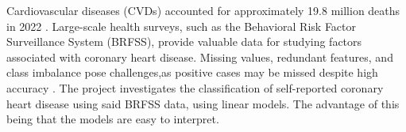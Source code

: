 Cardiovascular diseases (CVDs) accounted for approximately 19.8 million deaths in 2022 \cite{who2025}. Large-scale health surveys, such as the Behavioral Risk Factor Surveillance System (BRFSS), provide valuable data for studying factors associated with coronary heart disease. Missing values, redundant features, and class imbalance pose challenges,as positive cases may be missed despite high accuracy \cite{brfss2026}. The project investigates the classification of self-reported coronary heart disease using said BRFSS data, using linear models. The advantage of this being that the models are easy to interpret.


